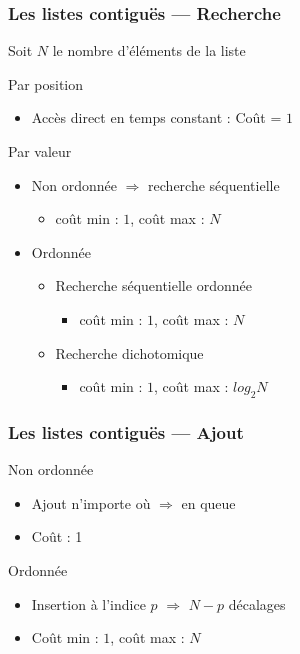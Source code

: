 \documentclass[table,handout,tikz,12pt,svgnames]{beamer}
\begin{document}
\begin{frame}[fragile=singleslide]
	\frametitle{Les listes contiguës --- Recherche}
	\begin{block}{}
        Soit $N$ le nombre d'éléments de la liste
	\end{block}
	\begin{block}{Par position}
		\begin{itemize}
			\item Accès direct en temps constant : Coût = $1$
		\end{itemize}
	\end{block}
	\begin{block}{Par valeur}
			\begin{itemize}
				\item Non ordonnée $\Rightarrow$ recherche séquentielle
				\begin{itemize}
					\item coût min : $1$, coût max : $N$
				\end{itemize}
				\item Ordonnée
				\begin{itemize}
					\item Recherche séquentielle ordonnée
					\begin{itemize}
						\item coût min : $1$, coût max : $N$
					\end{itemize}
					\item Recherche dichotomique
					\begin{itemize}
						\item coût min : $1$, coût max : $log_2N$
					\end{itemize}
				\end{itemize}
			\end{itemize}
	\end{block}
\end{frame}


\begin{frame}[fragile=singleslide]
	\frametitle{Les listes contiguës --- Ajout}
	\begin{block}{Non ordonnée}
		\begin{itemize}
			\item Ajout n'importe où $\Rightarrow$ en queue
			\item Coût : 1
		\end{itemize}
	\end{block}
	\begin{block}{Ordonnée}
		\begin{itemize}
			\item Insertion à l'indice $p$ $\Rightarrow$ $N-p$ décalages %
			\item Coût min : $1$, coût max : $N$
		\end{itemize}
	\end{block}
\end{frame}
\end{document}
